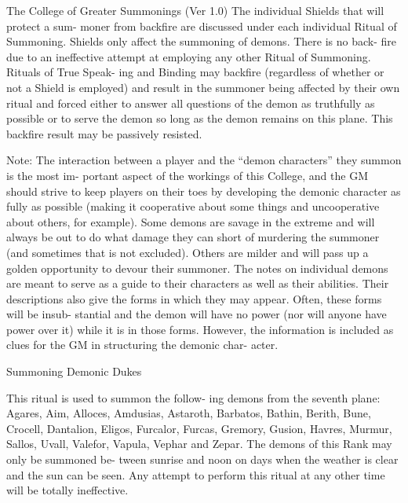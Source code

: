 \begin{Chapter}{The College of Greater Summonings (Ver 1.0)}
The  individual  Shields  that  will  protect  a  sum-
moner  from  backfire  are  discussed  under  each 
individual  Ritual  of  Summoning.  Shields  only 
affect the summoning of demons. There is no back-
fire due to an ineffective attempt at employing any 
other Ritual of Summoning. Rituals of True Speak-
ing  and  Binding  may  backfire  (regardless  of 
whether or not a Shield is employed) and result in 
the  summoner  being  affected  by  their  own  ritual 
and  forced  either  to  answer  all  questions  of  the 
demon  as  truthfully  as  possible  or  to  serve  the 
demon so long as the demon remains on this plane. 
This backfire result may be passively resisted. 

Note:  The  interaction  between  a  player  and  the 
“demon  characters”  they  summon  is  the  most  im-
portant aspect of the workings of this College, and 
the GM should strive to keep players on their toes 
by  developing  the  demonic  character  as  fully  as 
possible  (making  it  cooperative  about  some  things 
and  uncooperative  about  others,  for  example). 
Some  demons  are  savage  in  the  extreme  and  will 
always be out to do what damage they can short of 
murdering  the  summoner  (and  sometimes  that  is 
not excluded). Others are milder and will pass up a 
golden opportunity to devour their summoner. The 
notes on individual demons are meant to serve as a 
guide  to  their  characters  as  well  as  their  abilities. 
Their  descriptions  also  give  the  forms  in  which 
they may appear. Often, these forms will be insub-
stantial  and  the  demon  will  have  no  power  (nor 
will anyone have power over it) while it is in those 
forms.  However,  the  information  is  included  as 
clues  for  the  GM  in  structuring  the  demonic  char-
acter. 

\begin{ritual}[R-1]{Summoning Demonic Dukes }

\begin{effects}
 This  ritual  is  used  to  summon  the  follow-
ing  demons  from  the  seventh  plane:  Agares,  Aim, 
Alloces,  Amdusias,  Astaroth,  Barbatos,  Bathin, 
Berith,  Bune, Crocell,  Dantalion,  Eligos,  Furcalor, 
Furcas, Gremory, Gusion, Havres, Murmur, Sallos, 
Uvall,  Valefor,  Vapula,  Vephar  and  Zepar.  The 
demons  of  this  Rank  may  only  be  summoned  be-
tween sunrise and noon on days  when the weather 
is  clear  and  the  sun  can  be  seen.  Any  attempt  to 
perform this ritual at any other time will be totally 
ineffective. 


\end{effects}
\end{ritual}
\end{Chapter}
